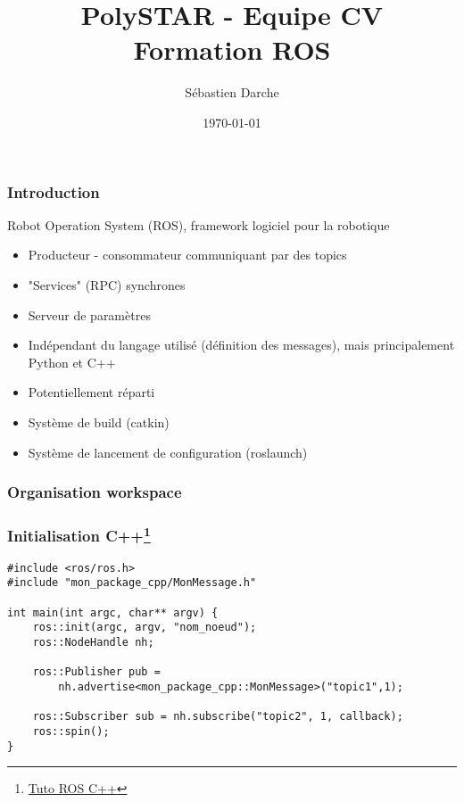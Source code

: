 \documentclass{beamer}
\title{PolySTAR - Equipe CV\\Formation ROS}
\author{Sébastien Darche}
\institute{PolySTAR - Polytechnique Montréal}
\date{\today}
\begin{document}
\frame{\titlepage}


\begin{frame}
\frametitle{Introduction}

Robot Operation System (ROS), framework logiciel pour la robotique

\begin{itemize}
    \item Producteur - consommateur communiquant par des topics
    \item "Services" (RPC) synchrones
    \item Serveur de paramètres
    \item Indépendant du langage utilisé (définition des messages), mais principalement Python et C++
    \item Potentiellement réparti
    \item Système de build (catkin)
    \item Système de lancement de configuration (roslaunch)
\end{itemize}

\end{frame}


\begin{frame}
\frametitle{Organisation workspace}
\footnotesize{
}
\end{frame}

\begin{frame}[fragile]
\frametitle{Initialisation
C++\footnote{\href{http://wiki.ros.org/ROS/Tutorials/WritingPublisherSubscriber\%28c\%2B\%2B\%29
}{Tuto ROS C++}}
}
\begin{verbatim}
#include <ros/ros.h>
#include "mon_package_cpp/MonMessage.h"

int main(int argc, char** argv) {
    ros::init(argc, argv, "nom_noeud");
    ros::NodeHandle nh;

    ros::Publisher pub = 
        nh.advertise<mon_package_cpp::MonMessage>("topic1",1);

    ros::Subscriber sub = nh.subscribe("topic2", 1, callback);
    ros::spin();
}
\end{verbatim}

\end{frame}
\end{document}
